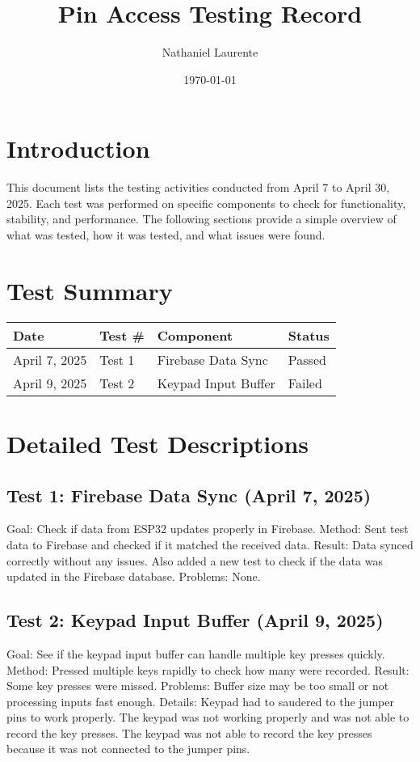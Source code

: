 \documentclass{article}
\title{Pin Access Testing Record}
\author{Nathaniel Laurente}
\date{\today}
\begin{document}
\maketitle

\section*{Introduction}
This document lists the testing activities conducted from April 7 to April 30, 2025. Each test was performed on specific components to check for functionality, stability, and performance. The following sections provide a simple overview of what was tested, how it was tested, and what issues were found.

\section*{Test Summary}
\begin{tabular}{| l | l | l | l |}
\hline
\textbf{Date} & \textbf{Test \#} & \textbf{Component} & \textbf{Status} \\
\hline
April 7, 2025 & Test 1 & Firebase Data Sync & Passed \\
April 9, 2025 & Test 2 & Keypad Input Buffer & Failed \\


\hline
\end{tabular}

\section*{Detailed Test Descriptions}

\subsection*{Test 1: Firebase Data Sync (April 7, 2025)}
Goal: Check if data from ESP32 updates properly in Firebase.
Method: Sent test data to Firebase and checked if it matched the received data.
Result: Data synced correctly without any issues. Also added a new test to check if the data was updated in the Firebase database.
Problems: None.

\subsection*{Test 2: Keypad Input Buffer (April 9, 2025)}
Goal: See if the keypad input buffer can handle multiple key presses quickly.
Method: Pressed multiple keys rapidly to check how many were recorded.
Result: Some key presses were missed.
Problems: Buffer size may be too small or not processing inputs fast enough.
Details: Keypad had to saudered to the jumper pins to work properly. The keypad was not working properly and was not able to record the key presses. The keypad was not able to record the key presses because it was not connected to the jumper pins. 
\end{document}
